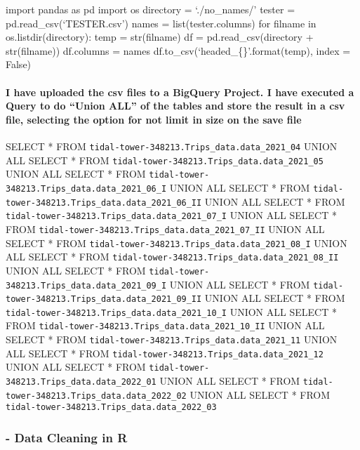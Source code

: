 \documentclass[
]{article}
\begin{document}
import pandas as pd import os directory = `./no\_names/' tester =
pd.read\_csv(`TESTER.csv') names = list(tester.columns) for filname in
os.listdir(directory): temp = str(filname) df = pd.read\_csv(directory +
str(filname)) df.columns = names df.to\_csv(`headed\_\{\}'.format(temp),
index = False)

\hypertarget{i-have-uploaded-the-csv-files-to-a-bigquery-project.-i-have-executed-a-query-to-do-union-all-of-the-tables-and-store-the-result-in-a-csv-file-selecting-the-option-for-not-limit-in-size-on-the-save-file}{%
\paragraph{I have uploaded the csv files to a BigQuery Project. I have
executed a Query to do ``Union ALL'' of the tables and store the result
in a csv file, selecting the option for not limit in size on the save
file}\label{i-have-uploaded-the-csv-files-to-a-bigquery-project.-i-have-executed-a-query-to-do-union-all-of-the-tables-and-store-the-result-in-a-csv-file-selecting-the-option-for-not-limit-in-size-on-the-save-file}}

SELECT * FROM \texttt{tidal-tower-348213.Trips\_data.data\_2021\_04}
UNION ALL SELECT * FROM
\texttt{tidal-tower-348213.Trips\_data.data\_2021\_05} UNION ALL SELECT
* FROM \texttt{tidal-tower-348213.Trips\_data.data\_2021\_06\_I} UNION
ALL SELECT * FROM
\texttt{tidal-tower-348213.Trips\_data.data\_2021\_06\_II} UNION ALL
SELECT * FROM \texttt{tidal-tower-348213.Trips\_data.data\_2021\_07\_I}
UNION ALL SELECT * FROM
\texttt{tidal-tower-348213.Trips\_data.data\_2021\_07\_II} UNION ALL
SELECT * FROM \texttt{tidal-tower-348213.Trips\_data.data\_2021\_08\_I}
UNION ALL SELECT * FROM
\texttt{tidal-tower-348213.Trips\_data.data\_2021\_08\_II} UNION ALL
SELECT * FROM \texttt{tidal-tower-348213.Trips\_data.data\_2021\_09\_I}
UNION ALL SELECT * FROM
\texttt{tidal-tower-348213.Trips\_data.data\_2021\_09\_II} UNION ALL
SELECT * FROM \texttt{tidal-tower-348213.Trips\_data.data\_2021\_10\_I}
UNION ALL SELECT * FROM
\texttt{tidal-tower-348213.Trips\_data.data\_2021\_10\_II} UNION ALL
SELECT * FROM \texttt{tidal-tower-348213.Trips\_data.data\_2021\_11}
UNION ALL SELECT * FROM
\texttt{tidal-tower-348213.Trips\_data.data\_2021\_12} UNION ALL SELECT
* FROM \texttt{tidal-tower-348213.Trips\_data.data\_2022\_01} UNION ALL
SELECT * FROM \texttt{tidal-tower-348213.Trips\_data.data\_2022\_02}
UNION ALL SELECT * FROM
\texttt{tidal-tower-348213.Trips\_data.data\_2022\_03}

\hypertarget{data-cleaning-in-r}{%
\subsubsection{- Data Cleaning in R}\label{data-cleaning-in-r}}
\end{document}
